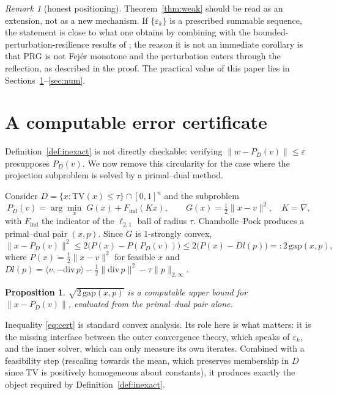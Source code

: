 \documentclass[11pt]{article}
\theoremstyle{plain}
\newtheorem{proposition}[theorem]{Proposition}
\theoremstyle{definition}
\theoremstyle{remark}
\newtheorem{remark}[theorem]{Remark}
\newcommand{\inner}[2]{\langle #1, #2 \rangle}
\newcommand{\norm}[1]{\lVert #1 \rVert}
\newcommand{\proj}[1]{P_{#1}}
\newcommand{\TV}{\mathrm{TV}}
\begin{document}
\begin{remark}[honest positioning]
\label{rem:position}
Theorem~\ref{thm:weak} should be read as an extension, not as a new mechanism.
If $\{\varepsilon_k\}$ is a prescribed summable sequence, the statement is
close to what one obtains by combining \cite{Malitsky2015} with the
bounded-perturbation-resilience results of \cite{Censor2017}; the reason it is
not an immediate corollary is that PRG is not Fej\'er monotone and the
perturbation enters through the reflection, as described in the proof. The
practical value of this paper lies in Sections~\ref{sec:cert}--\ref{sec:num}.
\end{remark}

\section{A computable error certificate}
\label{sec:cert}

Definition~\ref{def:inexact} is not directly checkable: verifying $\norm{w -
\proj{D}(v)} \le \varepsilon$ presupposes $\proj{D}(v)$. We now remove this
circularity for the case where the projection subproblem is solved by a
primal--dual method.

Consider $D = \{x : \TV(x) \le \tau\} \cap [0,1]^n$ and the subproblem
\begin{equation}
\label{eq:sub}
\proj{D}(v) = \arg\min_x \; G(x) + F_{\mathrm{ind}}(Kx), \qquad
G(x) = \tfrac12\norm{x-v}^2 , \quad K = \nabla ,
\end{equation}
with $F_{\mathrm{ind}}$ the indicator of the $\ell_{2,1}$ ball of radius
$\tau$. Chambolle--Pock \cite{ChambollePock2011} produces a primal--dual pair
$(x,p)$. Since $G$ is $1$-strongly convex,
\begin{equation}
\label{eq:cert}
\norm{x - \proj{D}(v)}^2 \le 2\bigl( P(x) - P(\proj{D}(v)) \bigr)
\le 2\bigl( P(x) - Dl(p) \bigr) =: 2\,\mathrm{gap}(x,p) ,
\end{equation}
where $P(x) = \tfrac12\norm{x-v}^2$ for feasible $x$ and
$Dl(p) = \inner{v}{-\mathrm{div}\,p} - \tfrac12\norm{\mathrm{div}\,p}^2 -
\tau\norm{p}_{2,\infty}$.

\begin{proposition}
\label{prop:cert}
$\sqrt{2\,\mathrm{gap}(x,p)}$ is a computable upper bound for $\norm{x -
\proj{D}(v)}$, evaluated from the primal--dual pair alone.
\end{proposition}

Inequality \eqref{eq:cert} is standard convex analysis. Its role here is what
matters: it is the missing interface between the outer convergence theory,
which speaks of $\varepsilon_k$, and the inner solver, which can only measure
its own iterates. Combined with a feasibility step (rescaling towards the mean,
which preserves membership in $D$ since $\TV$ is positively homogeneous about
constants), it produces exactly the object required by
Definition~\ref{def:inexact}.
\end{document}
